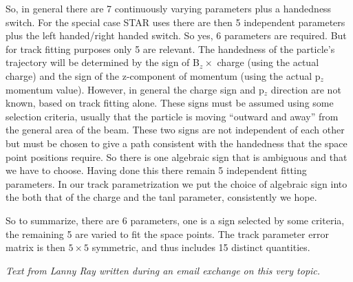 \documentclass[twoside]{article}
\begin{document}
    So, in general there are 7 continuously varying parameters plus a 
    handedness switch.  For the special case STAR uses there are then
    5 independent parameters plus the left handed/right handed
    switch. So yes, 6 parameters are required.  But for track fitting
    purposes only 5 are relevant.  The handedness of the particle's
    trajectory will be determined by the
    sign of B$_z \times $ charge (using the actual charge) and the sign of the
    z-component of momentum (using the actual p$_z$ momentum value).
    However, in general the charge sign and p$_z$ direction are not
    known, based on track fitting alone.  These signs must be assumed
    using some selection criteria, usually that the particle is moving
    ``outward and away'' from the general area of the beam.  These two signs
    are not independent of each other but must be chosen to give a path
    consistent with the handedness that the space point positions require.
    So there is one algebraic sign that is ambiguous and that we have to
    choose.  Having done this there remain 5 independent fitting parameters.
    In our track parametrization we put the choice of algebraic sign
    into the both that of the charge and the tanl parameter, consistently
    we hope.

    So to summarize, there are 6 parameters, one is a sign selected by some
    criteria, the remaining 5 are varied to fit the space points.
    The track parameter error matrix is then $5 \times 5$ symmetric, and thus
    includes 15 distinct quantities.

    \hfill\textit{Text from Lanny Ray written during an email exchange on this very topic.}

%
%

\printindex
\end{document}
